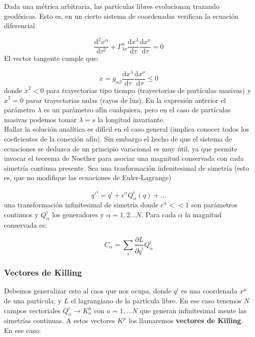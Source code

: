 \documentclass[12pt,a4paper]{book}
\numberwithin{equation}{section}
\numberwithin{figure}{section}
\newcommand{\parciales}[2]{\frac{\partial #1}{\partial #2}}
\newcommand{\D}{\mathrm{d}}
\newcommand{\derivadas}[2]{\frac{\D #1}{\D #2}}
\begin{document}
Dada una métrica arbitraria, las partículas libres evolucionan trazando geodésicas. Esto es, en un cierto sistema de coordenadas verifican la ecuación diferencial


\begin{equation}
\derivadas{^2x^\alpha}{\tau^2} + \Gamma^\alpha_{\lambda \nu} \derivadas{x^\lambda}{\tau	} \derivadas{x^\nu}{\tau} = 0
\end{equation}
El vector tangente cumple que:

\begin{equation}
\dot{x} = g_{\alpha \beta} \derivadas{x^\lambda}{\tau	} \derivadas{x^\nu}{\tau} \leq 0
\end{equation}
donde $\dot{x}^2<0$ para trayectorias tipo tiempo (trayectorias de partículas masivas) y $\dot{x}^2=0$ parar trayectorias nulas (rayos de luz). En la expresión anterior el parámetro $\lambda$ es un parámetro afín cualquiera, pero en el caso de partículas masivas podemos tomar $\lambda=s$ la longitud invariante. \\

Hallar la solución analítica es difícil en el caso general (implica conocer todos los coeficientes de la conexión afín). Sin embargo el hecho de que el sistema de ecuaciones se deduzca de un principio varacional es muy útil, ya que permite invocar el teorema de Noether para asociar una magnitud conservada con cada simetría continua presente. Sea  una trasformación infenitesimal de simetría (esto es, que no modifique las ecuaciones de Euler-Lagrange) 

\begin{equation}
q'^i = q^i + \epsilon^\alpha Q_{\alpha}^i (q) + \ldots
\end{equation}
una transformación infinitesimal de simetría donde $\epsilon^\alpha << 1$ son parámetros continuos y $Q_\alpha^i$ los generadores y $\alpha=1,2...N$. Para cada $\alpha$ la magnitud conservada es:

\begin{equation}
C_\alpha = \sum_i \parciales{L}{\dot{q}^i} Q_\alpha^i
\end{equation}

\subsubsection{Vectores de Killing}
Debemos generalizar esto al caos que nos ocupa, donde $q^i$ es una coordenada $x^\mu$ de una partícula, y $L$ el lagrangiano de la partícula libre. En ese caso tenemos $N$ campos vectoriales $Q_\alpha^i \rightarrow K_a^\mu$ con $a=1,...N$ que generan infinitesimal mente las simetrías continuas. A estos vectores $K^\mu$ los llamaremos \textbf{vectores de Killing}. En ese caso:
\end{document}
